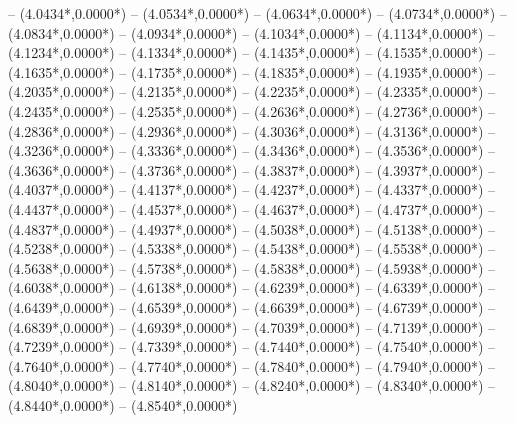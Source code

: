 {	-- ({4.0434*\dx},{0.0000*\dy})
	-- ({4.0534*\dx},{0.0000*\dy})
	-- ({4.0634*\dx},{0.0000*\dy})
	-- ({4.0734*\dx},{0.0000*\dy})
	-- ({4.0834*\dx},{0.0000*\dy})
	-- ({4.0934*\dx},{0.0000*\dy})
	-- ({4.1034*\dx},{0.0000*\dy})
	-- ({4.1134*\dx},{0.0000*\dy})
	-- ({4.1234*\dx},{0.0000*\dy})
	-- ({4.1334*\dx},{0.0000*\dy})
	-- ({4.1435*\dx},{0.0000*\dy})
	-- ({4.1535*\dx},{0.0000*\dy})
	-- ({4.1635*\dx},{0.0000*\dy})
	-- ({4.1735*\dx},{0.0000*\dy})
	-- ({4.1835*\dx},{0.0000*\dy})
	-- ({4.1935*\dx},{0.0000*\dy})
	-- ({4.2035*\dx},{0.0000*\dy})
	-- ({4.2135*\dx},{0.0000*\dy})
	-- ({4.2235*\dx},{0.0000*\dy})
	-- ({4.2335*\dx},{0.0000*\dy})
	-- ({4.2435*\dx},{0.0000*\dy})
	-- ({4.2535*\dx},{0.0000*\dy})
	-- ({4.2636*\dx},{0.0000*\dy})
	-- ({4.2736*\dx},{0.0000*\dy})
	-- ({4.2836*\dx},{0.0000*\dy})
	-- ({4.2936*\dx},{0.0000*\dy})
	-- ({4.3036*\dx},{0.0000*\dy})
	-- ({4.3136*\dx},{0.0000*\dy})
	-- ({4.3236*\dx},{0.0000*\dy})
	-- ({4.3336*\dx},{0.0000*\dy})
	-- ({4.3436*\dx},{0.0000*\dy})
	-- ({4.3536*\dx},{0.0000*\dy})
	-- ({4.3636*\dx},{0.0000*\dy})
	-- ({4.3736*\dx},{0.0000*\dy})
	-- ({4.3837*\dx},{0.0000*\dy})
	-- ({4.3937*\dx},{0.0000*\dy})
	-- ({4.4037*\dx},{0.0000*\dy})
	-- ({4.4137*\dx},{0.0000*\dy})
	-- ({4.4237*\dx},{0.0000*\dy})
	-- ({4.4337*\dx},{0.0000*\dy})
	-- ({4.4437*\dx},{0.0000*\dy})
	-- ({4.4537*\dx},{0.0000*\dy})
	-- ({4.4637*\dx},{0.0000*\dy})
	-- ({4.4737*\dx},{0.0000*\dy})
	-- ({4.4837*\dx},{0.0000*\dy})
	-- ({4.4937*\dx},{0.0000*\dy})
	-- ({4.5038*\dx},{0.0000*\dy})
	-- ({4.5138*\dx},{0.0000*\dy})
	-- ({4.5238*\dx},{0.0000*\dy})
	-- ({4.5338*\dx},{0.0000*\dy})
	-- ({4.5438*\dx},{0.0000*\dy})
	-- ({4.5538*\dx},{0.0000*\dy})
	-- ({4.5638*\dx},{0.0000*\dy})
	-- ({4.5738*\dx},{0.0000*\dy})
	-- ({4.5838*\dx},{0.0000*\dy})
	-- ({4.5938*\dx},{0.0000*\dy})
	-- ({4.6038*\dx},{0.0000*\dy})
	-- ({4.6138*\dx},{0.0000*\dy})
	-- ({4.6239*\dx},{0.0000*\dy})
	-- ({4.6339*\dx},{0.0000*\dy})
	-- ({4.6439*\dx},{0.0000*\dy})
	-- ({4.6539*\dx},{0.0000*\dy})
	-- ({4.6639*\dx},{0.0000*\dy})
	-- ({4.6739*\dx},{0.0000*\dy})
	-- ({4.6839*\dx},{0.0000*\dy})
	-- ({4.6939*\dx},{0.0000*\dy})
	-- ({4.7039*\dx},{0.0000*\dy})
	-- ({4.7139*\dx},{0.0000*\dy})
	-- ({4.7239*\dx},{0.0000*\dy})
	-- ({4.7339*\dx},{0.0000*\dy})
	-- ({4.7440*\dx},{0.0000*\dy})
	-- ({4.7540*\dx},{0.0000*\dy})
	-- ({4.7640*\dx},{0.0000*\dy})
	-- ({4.7740*\dx},{0.0000*\dy})
	-- ({4.7840*\dx},{0.0000*\dy})
	-- ({4.7940*\dx},{0.0000*\dy})
	-- ({4.8040*\dx},{0.0000*\dy})
	-- ({4.8140*\dx},{0.0000*\dy})
	-- ({4.8240*\dx},{0.0000*\dy})
	-- ({4.8340*\dx},{0.0000*\dy})
	-- ({4.8440*\dx},{0.0000*\dy})
	-- ({4.8540*\dx},{0.0000*\dy})
}
